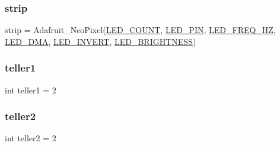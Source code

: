 \subsubsection{\texorpdfstring{strip}{strip}}
{\footnotesize\ttfamily strip = Adafruit\+\_\+\+Neo\+Pixel(\hyperlink{namespacegame_1_1i2c_a0150eb7d9551697284fa8def1d6a5e78}{L\+E\+D\+\_\+\+C\+O\+U\+NT}, \hyperlink{namespacegame_1_1i2c_a7d6ed2029581b42043aa921270f03362}{L\+E\+D\+\_\+\+P\+IN}, \hyperlink{namespacegame_1_1i2c_a4985f02a4206248cfb12e46ac7e5fa1a}{L\+E\+D\+\_\+\+F\+R\+E\+Q\+\_\+\+HZ}, \hyperlink{namespacegame_1_1i2c_a3577c4e268c23fe92bb64fdb4c878027}{L\+E\+D\+\_\+\+D\+MA}, \hyperlink{namespacegame_1_1i2c_a02f2f11be4e8df2102f522e3e8983d7b}{L\+E\+D\+\_\+\+I\+N\+V\+E\+RT}, \hyperlink{namespacegame_1_1i2c_ac0bf31bc536242ae4682e1d4e782f671}{L\+E\+D\+\_\+\+B\+R\+I\+G\+H\+T\+N\+E\+SS})}

\hypertarget{namespacegame_1_1i2c_a7ddd85a4f113648910e222fb76d93506}{}\label{namespacegame_1_1i2c_a7ddd85a4f113648910e222fb76d93506} 
\subsubsection{\texorpdfstring{teller1}{teller1}}
{\footnotesize\ttfamily int teller1 = 2}

\hypertarget{namespacegame_1_1i2c_a255c8064ec67df52c6aadc54ea744b11}{}\label{namespacegame_1_1i2c_a255c8064ec67df52c6aadc54ea744b11} 
\subsubsection{\texorpdfstring{teller2}{teller2}}
{\footnotesize\ttfamily int teller2 = 2}

